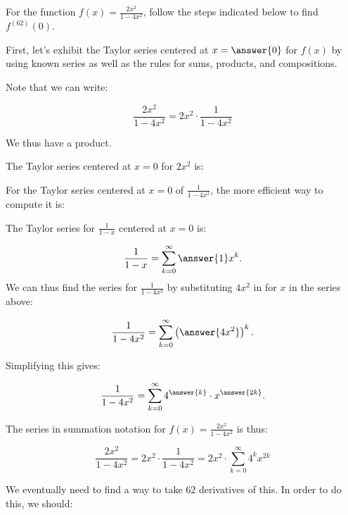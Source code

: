 \documentclass{ximera}
\author{Jim Talamo}
\begin{document}
\begin{exercise}
For the function $f(x) = \frac{2x^2}{1-4x^2}$, follow the steps indicated below to find $f^{(62)}(0)$.

First, let's exhibit the Taylor series centered at $x=\answer{0}$ for $f(x)$ by using known series as well as the rules for sums, products, and compositions.

Note that we can write:

\[
 \frac{2x^2}{1-4x^2} =  2x^2 \cdot \frac{1}{1-4x^2}
\]

We thus have a product.  

The Taylor series centered at $x=0$ for $2x^2$ is:
\begin{multipleChoice}
\end{multipleChoice}

For the Taylor series centered at $x=0$ of $ \frac{1}{1-4x^2}$, the more efficient way to compute it is:
\begin{multipleChoice}
\end{multipleChoice}

The Taylor series for $\frac{1}{1-x}$ centered at $x=0$ is:

\[
\frac{1}{1-x} = \sum_{k=0}^{\infty} \answer{1}x^k.
\]
We can thus find the series for  $ \frac{1}{1-4x^2}$ by substituting $4x^2$ in for $x$ in the series above:

\[
\frac{1}{1-4x^2} = \sum_{k=0}^{\infty} \left(\answer{4x^2}\right)^k.
\]

Simplifying this gives:

\[
\frac{1}{1-4x^2} = \sum_{k=0}^{\infty} 4^{\answer{k}} \cdot x^{\answer{2k}}.
\]

\begin{exercise}
The series in summation notation for $f(x) = \frac{2x^2}{1-4x^2}$ is thus:

\[
\frac{2x^2}{1-4x^2} = 2x^2 \cdot \frac{1}{1-4x^2} = 2x^2 \cdot  \sum_{k=0}^{\infty} 4^k x^{2k}
\]

We eventually need to find a way to take $62$ derivatives of this.  In order to do this, we should:
\begin{selectAll}
\end{selectAll}


\end{exercise}
\end{exercise}
\end{document}
